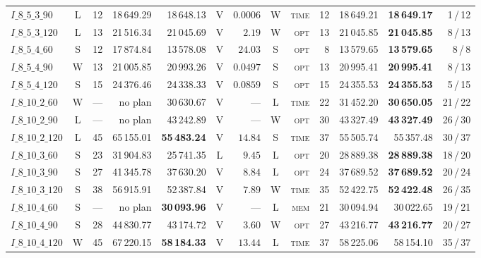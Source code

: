 \begin{table}[!htbp]
{\begin{tabular}{lcrrrcrcrrrrr}
$I\_8\_5\_3\_90$ & L & 12 & 18\,649.29 & 18\,648.13 & V & $0.0006$ & W & \textsc{time} & 12 & 18\,649.21 & \textbf{18\,649.17} & 1\,/\,12 \\
$I\_8\_5\_3\_120$ & L & 13 & 21\,516.34 & 21\,045.69 & V & $2.19$ & W & \textsc{opt} & 13 & 21\,045.85 & \textbf{21\,045.85} & 8\,/\,13 \\
$I\_8\_5\_4\_60$ & S & 12 & 17\,874.84 & 13\,578.08 & V & $24.03$ & S & \textsc{opt} & 8 & 13\,579.65 & \textbf{13\,579.65} & 8\,/\,8 \\
$I\_8\_5\_4\_90$ & W & 13 & 21\,005.85 & 20\,993.26 & V & $0.0497$ & S & \textsc{opt} & 13 & 20\,995.41 & \textbf{20\,995.41} & 8\,/\,13 \\
$I\_8\_5\_4\_120$ & S & 15 & 24\,376.46 & 24\,338.33 & V & $0.0859$ & S & \textsc{opt} & 15 & 24\,355.53 & \textbf{24\,355.53} & 5\,/\,15 \\
$I\_8\_10\_2\_60$ & W & --- & no plan & 30\,630.67 & V & --- & L & \textsc{time} & 22 & 31\,452.20 & \textbf{30\,650.05} & 21\,/\,22 \\
$I\_8\_10\_2\_90$ & L & --- & no plan & 43\,242.89 & V & --- & W & \textsc{opt} & 30 & 43\,327.49 & \textbf{43\,327.49} & 26\,/\,30 \\
$I\_8\_10\_2\_120$ & L & 45 & 65\,155.01 & \textbf{55\,483.24} & V & $14.84$ & S & \textsc{time} & 37 & 55\,505.74 & 55\,357.48 & 30\,/\,37 \\
$I\_8\_10\_3\_60$ & S & 23 & 31\,904.83 & 25\,741.35 & L & $9.45$ & L & \textsc{opt} & 20 & 28\,889.38 & \textbf{28\,889.38} & 18\,/\,20 \\
$I\_8\_10\_3\_90$ & S & 27 & 41\,345.78 & 37\,630.20 & V & $8.84$ & L & \textsc{opt} & 24 & 37\,689.52 & \textbf{37\,689.52} & 20\,/\,24 \\
$I\_8\_10\_3\_120$ & S & 38 & 56\,915.91 & 52\,387.84 & V & $7.89$ & W & \textsc{time} & 35 & 52\,422.75 & \textbf{52\,422.48} & 26\,/\,35 \\
$I\_8\_10\_4\_60$ & S & --- & no plan & \textbf{30\,093.96} & V & --- & L & \textsc{mem} & 21 & 30\,094.94 & 30\,022.65 & 19\,/\,21 \\
$I\_8\_10\_4\_90$ & S & 28 & 44\,830.77 & 43\,174.72 & V & $3.60$ & W & \textsc{opt} & 27 & 43\,216.77 & \textbf{43\,216.77} & 20\,/\,27 \\
$I\_8\_10\_4\_120$ & W & 45 & 67\,220.15 & \textbf{58\,184.33} & V & $13.44$ & L & \textsc{time} & 37 & 58\,225.06 & 58\,154.10 & 35\,/\,37 \\
\bottomrule
\end{tabular}}
\end{table}
